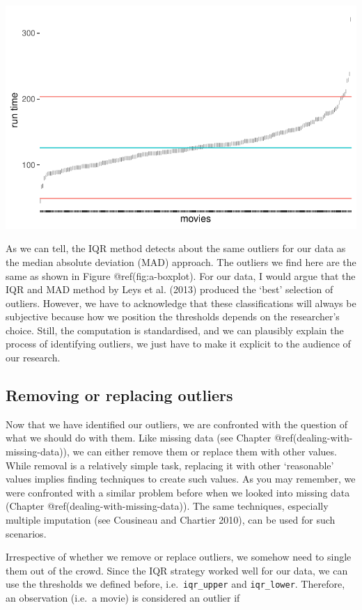\documentclass[
  letterpaper,
]{krantz}
\begin{document}
\includegraphics{09_sources_of_bias_files/figure-pdf/iqr-threshold-1.pdf}

As we can tell, the IQR method detects about the same outliers for our
data as the median absolute deviation (MAD) approach. The outliers we
find here are the same as shown in Figure @ref(fig:a-boxplot). For our
data, I would argue that the IQR and MAD method by Leys et al. (2013)
produced the `best' selection of outliers. However, we have to
acknowledge that these classifications will always be subjective because
how we position the thresholds depends on the researcher's choice.
Still, the computation is standardised, and we can plausibly explain the
process of identifying outliers, we just have to make it explicit to the
audience of our research.

\subsection{Removing or replacing
outliers}\label{sec-removing-or-replacing-outliers}

Now that we have identified our outliers, we are confronted with the
question of what we should do with them. Like missing data (see Chapter
@ref(dealing-with-missing-data)), we can either remove them or replace
them with other values. While removal is a relatively simple task,
replacing it with other `reasonable' values implies finding techniques
to create such values. As you may remember, we were confronted with a
similar problem before when we looked into missing data (Chapter
@ref(dealing-with-missing-data)). The same techniques, especially
multiple imputation (see Cousineau and Chartier 2010), can be used for
such scenarios.

Irrespective of whether we remove or replace outliers, we somehow need
to single them out of the crowd. Since the IQR strategy worked well for
our data, we can use the thresholds we defined before,
i.e.~\texttt{iqr\_upper} and \texttt{iqr\_lower}. Therefore, an
observation (i.e.~a movie) is considered an outlier if
\end{document}
